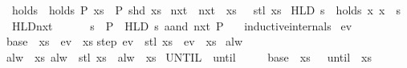 \begin{isabellebody}
\isamarkupfalse%
\ holds\ \ {\isachardoublequoteopen}holds\ P\ xs\ {\isasymlongleftrightarrow}\ P\ {\isacharparenleft}shd\ xs{\isacharparenright}{\isachardoublequoteclose}\isanewline
{}\isamarkupfalse%
\ nxt\ \ {\isachardoublequoteopen}nxt\ {\isasymphi}\ xs\ {\isacharequal}\ {\isasymphi}\ {\isacharparenleft}stl\ xs{\isacharparenright}{\isachardoublequoteclose}\isanewline
\isanewline
{}\isamarkupfalse%
\ {\isachardoublequoteopen}HLD\ s\ {\isacharequal}\ holds\ {\isacharparenleft}{\isasymlambda}x{\isachardot}\ x\ {\isasymin}\ s{\isacharparenright}{\isachardoublequoteclose}\isanewline
\isanewline
{}\isamarkupfalse%
\ HLD{\isacharunderscore}nxt\ {\isacharparenleft}\ {\isachardoublequoteopen}{\isasymcdot}{\isachardoublequoteclose}\ {}{}{\isacharparenright}\ \isanewline
\ \ {\isachardoublequoteopen}s\ {\isasymcdot}\ P\ {\isasymequiv}\ HLD\ s\ aand\ nxt\ P{\isachardoublequoteclose}\isanewline
\isanewline
{}\isamarkupfalse%
\isanewline
\ \ \ {\isacharbrackleft}{\isacharbrackleft}inductive{\isacharunderscore}internals{\isacharbrackright}{\isacharbrackright}\isanewline
{}\isanewline
\isanewline
{}\isamarkupfalse%
\ ev\ \ {\isasymphi}\ \isanewline
base{\isacharcolon}\ {\isachardoublequoteopen}{\isasymphi}\ xs\ {\isasymLongrightarrow}\ ev\ {\isasymphi}\ xs{\isachardoublequoteclose}\isanewline
{\isacharbar}\isanewline
step{\isacharcolon}\ {\isachardoublequoteopen}ev\ {\isasymphi}\ {\isacharparenleft}stl\ xs{\isacharparenright}\ {\isasymLongrightarrow}\ ev\ {\isasymphi}\ xs{\isachardoublequoteclose}\isanewline
\isanewline
{}\isamarkupfalse%
\ alw\ \ {\isasymphi}\ \isanewline
alw{\isacharcolon}\ {\isachardoublequoteopen}{\isasymlbrakk}{\isasymphi}\ xs{\isacharsemicolon}\ alw\ {\isasymphi}\ {\isacharparenleft}stl\ xs{\isacharparenright}{\isasymrbrakk}\ {\isasymLongrightarrow}\ alw\ {\isasymphi}\ xs{\isachardoublequoteclose}\isanewline
\isanewline
%
\isanewline
{}\isamarkupfalse%
\ UNTIL\ {\isacharparenleft}\ {\isachardoublequoteopen}until{\isachardoublequoteclose}\ {}{}{\isacharparenright}\ \ {\isasymphi}\ {\isasympsi}\ \isanewline
base{\isacharcolon}\ {\isachardoublequoteopen}{\isasympsi}\ xs\ {\isasymLongrightarrow}\ {\isacharparenleft}{\isasymphi}\ until\ {\isasympsi}{\isacharparenright}\ xs{\isachardoublequoteclose}\isanewline

\end{isabellebody}
